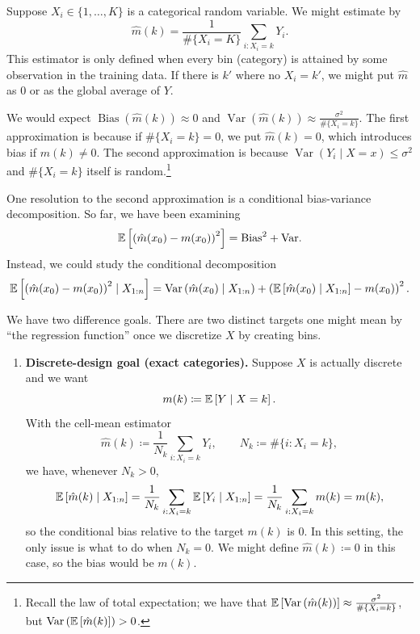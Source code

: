 \begin{remark}	Suppose $X_i \in \{1,\ldots,K\}$ is a categorical random variable. We might estimate by \[
		\hat{m}(k) = \frac{1}{\# \{X_i = K\}} \sum\limits_{i: X_i = k}^{} Y_i
	.\] This estimator is only defined when every bin (category) is attained by some observation in the training data. If there is $k'$ where no $X_i = k'$, we might put $\hat{m}$ as $0$ or as the global average of $Y$.

	We would expect $\operatorname{Bias}\left(\hat{m}(k)\right) \approx 0$ and $\operatorname{Var}\left(\hat{m}(k)\right) \approx \frac{\sigma^2}{\# \{X_i = k\}}$. 
	The first approximation is because if $\#\{X_i = k\} = 0$, we put $\hat{m}(k) = 0$, which introduces bias if $m(k) \ne 0$. The second approximation is because $\operatorname{Var}\left(Y_i \mid X= x\right) \le \sigma^2$ and $\#\{X_i = k\}$ itself is random.\footnote{Recall the law of total expectation; we have that $\mathbb{E}\left[\operatorname{Var}\left(\hat{m}(k)\right)\right] \approx \frac{\sigma^2}{\# \{X_i = k\}}$, but $\operatorname{Var}\left(\mathbb{E}\left[\hat{m}(k)\right] \right) > 0$.}

	One resolution to the second approximation is a conditional bias-variance decomposition.
	So far, we have been examining
	\[
		\mathbb{E}\left[\left( \hat{m}(x_0) - m(x_0) \right)^2\right]
		= \text{Bias}^2 + \text{Var}
	.\]
	Instead, we could study the conditional decomposition
	\[
		\mathbb{E}\left[\left( \hat{m}(x_0) - m(x_0) \right)^2 \mid X_{1:n}\right]
		= \operatorname{Var}\left(\hat{m}(x_0)\mid X_{1:n}\right)
		+ \left(\mathbb{E}\left[\hat{m}(x_0)\mid X_{1:n}\right]-m(x_0)\right)^2
	.\]

	We have two difference goals.
	There are two distinct targets one might mean by ``the regression function'' once we discretize $X$ by creating bins.

	\begin{enumerate}[label=(\arabic*)]
		\item \textbf{Discrete-design goal (exact categories).}
		Suppose $X$ is actually discrete and we want
		\[
			m(k) \coloneqq \mathbb{E}\left[Y\mid X=k\right].
		\]
		With the cell-mean estimator
		\[
			\hat{m}(k) \coloneqq \frac{1}{N_k}\sum\limits_{i: X_i=k}^{} Y_i,
			\qquad
			N_k \coloneqq \#\{i: X_i=k\},
		\]
		we have, whenever $N_k>0$,
		\[
			\mathbb{E}\left[\hat{m}(k)\mid X_{1:n}\right]
			= \frac{1}{N_k}\sum\limits_{i:X_i=k}^{}\mathbb{E}\left[Y_i\mid X_{1:n}\right]
			= \frac{1}{N_k}\sum\limits_{i:X_i=k}^{} m(k)
			= m(k),
		\]
		so the conditional bias relative to the target $m(k)$ is $0$. In this setting, the only issue is what to do when $N_k=0$. We might define $\hat{m}(k) \coloneqq 0$ in this case, so the bias would be $m(k)$.


\end{enumerate}
\end{remark}
